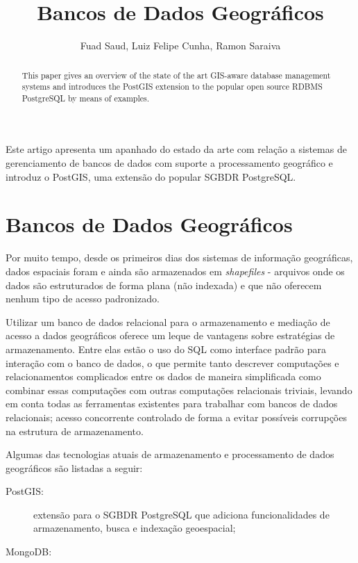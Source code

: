 \documentclass[12pt]{article}
\title{Bancos de Dados Geográficos}
\author{Fuad Saud\inst{1}, Luiz Felipe Cunha\inst{1}, Ramon Saraiva\inst{1}}
\begin{document}
\maketitle

\begin{abstract}
  This paper gives an overview of the state of the art GIS-aware database
  management systems and introduces the PostGIS extension to the popular
  open source RDBMS PostgreSQL by means of examples.
\end{abstract}

\begin{resumo}
  Este artigo apresenta um apanhado do estado da arte com relação a sistemas de
  gerenciamento de bancos de dados com suporte a processamento geográfico e
  introduz o PostGIS, uma extensão do popular SGBDR PostgreSQL.
\end{resumo}


\section{Bancos de Dados Geográficos}

Por muito tempo, desde os primeiros dias dos sistemas de informação
geográficas, dados espaciais foram e ainda são armazenados em
\textit{shapefiles} - arquivos onde os dados são estruturados de forma plana
(não indexada) e que não oferecem nenhum tipo de acesso padronizado.

Utilizar um banco de dados relacional para o armazenamento e mediação de acesso
a dados geográficos oferece um leque de vantagens sobre estratégias de
armazenamento. Entre elas estão o uso do SQL como interface padrão para
interação com o banco de dados, o que permite tanto descrever computações e
relacionamentos complicados entre os dados de maneira simplificada como
combinar essas computações com outras computações relacionais triviais, levando
em conta todas as ferramentas existentes para trabalhar com bancos de dados
relacionais; acesso concorrente controlado de forma a evitar possíveis
corrupções na estrutura de armazenamento.

Algumas das tecnologias atuais de armazenamento e processamento de dados
geográficos são listadas a seguir:

\begin{description}
\item[PostGIS:] extensão para o SGBDR PostgreSQL que adiciona funcionalidades
  de armazenamento, busca e indexação geoespacial;
\item[MongoDB:]
\end{description}
\end{document}
